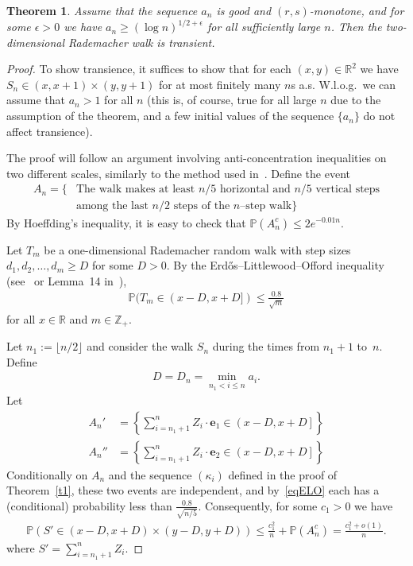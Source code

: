 \documentclass[12pt]{article}
\newtheorem{theorem}{Theorem}
\renewcommand\P{\mathbb{P}}
\newcommand\R{\mathbb{R}}
\newcommand\Z{\mathbb{Z}}
\newcommand\be{\mathbf{e}}
\begin{document}
\begin{theorem}\label{Tdouble}
Assume that the sequence $a_n$ is good and $(r,s)$-monotone, and for some $\epsilon>0$ we have $a_n\ge (\log n)^{1/2+\epsilon}$ for all sufficiently large $n$. Then the two-dimensional Rademacher walk is transient.
\end{theorem}
\begin{proof}
To show transience, it suffices to show that for each $(x,y)\in \R^2$ we have $S_n\in (x,x+1)\times(y,y+1)$ for at most finitely many $n$s a.s. W.l.o.g.\ we can assume that $a_n> 1$ for all $n$ (this is, of course, true for all large $n$ due to the assumption of the theorem, and a few initial values of the sequence $\{a_n\}$ do not affect transience).

The proof will follow an argument involving anti-concentration inequalities on two different scales, similarly to the method used in~\cite{Bristol}. Define the event 
\begin{align*}
A_n=\{&\text{The walk makes at least $n/5$ horizontal and $n/5$ vertical steps} 
 \\
 & \text{among the last $n/2$ steps of the $n$--step walk}\}
\end{align*}
By Hoeffding's inequality, it is easy to check that $\P(A_n^c)\le 2e^{-0.01 n}$.

Let  $T_m$ be a one-dimensional Rademacher random walk with step sizes $d_1,d_2,\dots,d_m\ge D$ for some $D>0$.  By the Erd\H{o}s--Littlewood--Offord inequality (see~\cite{Erdos} or Lemma~14 in~\cite{Bristol}),
\begin{align}\label{eqELO}
\P(T_m \in (x-D,x+D])\leq\frac{0.8}{\sqrt{m}}  
\end{align}
for all $x\in\R$ and $m\in \Z_+$.

Let $n_1:=\lfloor n/2\rfloor$ and consider the walk $S_n$ during the times from $n_1+1$ to~$n$. Define 
\begin{align}\label{eqDn}
D=D_n%
= \min_{n_1< i\le n}a_i .
\end{align}
Let
\begin{align*}  
A_n'&=\left\{\sum_{i=n_1+1}^n Z_i\cdot \be_1\in \left(x-D,x+D\right]\right\}
\\
A_n''&=\left\{\sum_{i=n_1+1}^n Z_i\cdot \be_2\in \left(x-D,x+D\right]\right\}
\end{align*}
Conditionally on $A_n$ and the sequence $(\kappa_i)$ defined in the proof of Theorem~\ref{t1}, these two events are independent, and by~\eqref{eqELO} each has a (conditional) probability less than $\frac{0.8}{\sqrt{n/5}}$. Consequently, for some $c_1>0$ we have
\begin{align}\label{eqS'}
\P\left(S'\in (x-D,x+D)\times(y-D,y+D)\right)
\le \frac{c_1^2}n+\P(A_n^c)=\frac{c_1^2+o(1)}n.    
\end{align}
where $S'=\sum_{i=n_1+1}^n Z_i$.


\end{proof}
\end{document}
